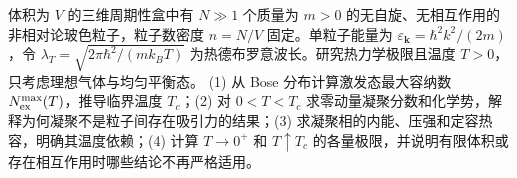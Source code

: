 体积为 \(V\) 的三维周期性盒中有 \(N\gg1\) 个质量为 \(m>0\) 的无自旋、无相互作用的非相对论玻色粒子，粒子数密度 \(n=N/V\) 固定。单粒子能量为 \(\varepsilon_{\boldsymbol k}=\hbar^2k^2/(2m)\)，令 \(\lambda_T=\sqrt{2\pi\hbar^2/(mk_BT)}\) 为热德布罗意波长。研究热力学极限且温度 \(T>0\)，只考虑理想气体与均匀平衡态。
(1) 从 Bose 分布计算激发态最大容纳数 \(N_{\rm ex}^{\max}(T)\)，推导临界温度 \(T_c\)；(2) 对 \(0<T<T_c\) 求零动量凝聚分数和化学势，解释为何凝聚不是粒子间存在吸引力的结果；(3) 求凝聚相的内能、压强和定容热容，明确其温度依赖；(4) 计算 \(T\to0^+\) 和 \(T\uparrow T_c\) 的各量极限，并说明有限体积或存在相互作用时哪些结论不再严格适用。
